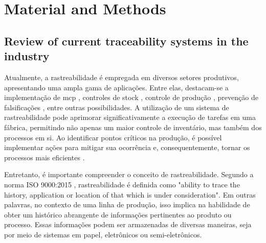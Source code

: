 \chapter{Material and Methods}\label{cap:studyOfTools}



\section{Review of current traceability systems in the  industry}\label{woodFurnitureIndustryTraceabilityReview}

Atualmente, a rastreabilidade é empregada em diversos setores produtivos, apresentando uma ampla gama de aplicações. Entre elas, destacam-se a implementação de \acrfull{mcp} \cite{ZHONG2013}, controles de stock \cite{Anssens2011, Yue2011}, controle de produção \cite{Engelhardt2012}, prevenção de falsificações \cite{Rida2007}, entre outras possibilidades. A utilização de um sistema de rastreabilidade pode aprimorar significativamente a execução de tarefas em uma fábrica, permitindo não apenas um maior controle de inventário, mas também dos processos em si. Ao identificar pontos críticos na produção, é possível implementar ações para mitigar sua ocorrência e, consequentemente, tornar os processos mais eficientes \cite{Chua2012}.


Entretanto, é importante compreender o conceito de rastreabilidade. Segundo a norma ISO 9000:2015 \cite{iso_9000_2015}, rastreabilidade é definida como "ability to trace the history, application or location of that which is under consideration". Em outras palavras, no contexto de uma linha de produção, isso implica na habilidade de obter um histórico abrangente de informações pertinentes ao produto ou processo. Essas informações podem ser armazenadas de diversas maneiras, seja por meio de sistemas em papel, eletrônicos ou semi-eletrônicos.

